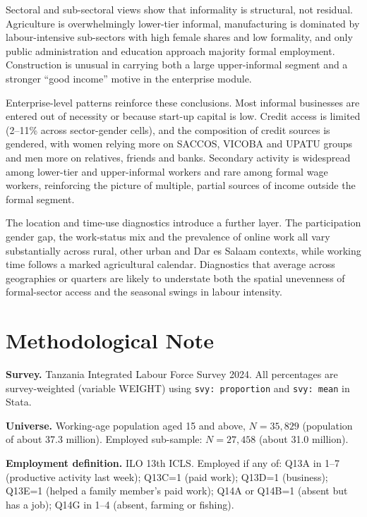 \documentclass[12pt,a4paper]{article}
\begin{document}
Sectoral and sub-sectoral views show that informality is structural, not residual. Agriculture is overwhelmingly lower-tier informal, manufacturing is dominated by labour-intensive sub-sectors with high female shares and low formality, and only public administration and education approach majority formal employment. Construction is unusual in carrying both a large upper-informal segment and a stronger ``good income'' motive in the enterprise module.

Enterprise-level patterns reinforce these conclusions. Most informal businesses are entered out of necessity or because start-up capital is low. Credit access is limited (2--11\% across sector-gender cells), and the composition of credit sources is gendered, with women relying more on SACCOS, VICOBA and UPATU groups and men more on relatives, friends and banks. Secondary activity is widespread among lower-tier and upper-informal workers and rare among formal wage workers, reinforcing the picture of multiple, partial sources of income outside the formal segment.

The location and time-use diagnostics introduce a further layer. The participation gender gap, the work-status mix and the prevalence of online work all vary substantially across rural, other urban and Dar es Salaam contexts, while working time follows a marked agricultural calendar. Diagnostics that average across geographies or quarters are likely to understate both the spatial unevenness of formal-sector access and the seasonal swings in labour intensity.


\section*{Methodological Note}

\textbf{Survey.} Tanzania Integrated Labour Force Survey 2024. All percentages are survey-weighted (variable WEIGHT) using \texttt{svy: proportion} and \texttt{svy: mean} in Stata.

\textbf{Universe.} Working-age population aged 15 and above, $N = 35{,}829$ (population of about 37.3 million). Employed sub-sample: $N = 27{,}458$ (about 31.0 million).

\textbf{Employment definition.} ILO 13th ICLS. Employed if any of: Q13A in 1--7 (productive activity last week); Q13C=1 (paid work); Q13D=1 (business); Q13E=1 (helped a family member's paid work); Q14A or Q14B=1 (absent but has a job); Q14G in 1--4 (absent, farming or fishing).
\end{document}
